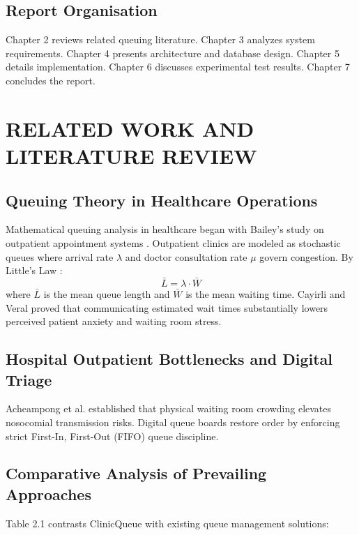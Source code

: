 \documentclass[12pt,a4paper,oneside]{report}
\begin{document}
\section{Report Organisation}
Chapter 2 reviews related queuing literature. Chapter 3 analyzes system requirements. Chapter 4 presents architecture and database design. Chapter 5 details implementation. Chapter 6 discusses experimental test results. Chapter 7 concludes the report.

\chapter{RELATED WORK AND LITERATURE REVIEW}

\section{Queuing Theory in Healthcare Operations}
Mathematical queuing analysis in healthcare began with Bailey's study on outpatient appointment systems \cite{bailey1952study}. Outpatient clinics are modeled as stochastic queues where arrival rate $\lambda$ and doctor consultation rate $\mu$ govern congestion. By Little's Law \cite{little1961proof}:
\begin{equation}
    \bar{L} = \lambda \cdot \bar{W}
\end{equation}
where $\bar{L}$ is the mean queue length and $\bar{W}$ is the mean waiting time. Cayirli and Veral \cite{cayirli2003outpatient} proved that communicating estimated wait times substantially lowers perceived patient anxiety and waiting room stress.

\section{Hospital Outpatient Bottlenecks and Digital Triage}
Acheampong et al. \cite{acheampong2019queuing} established that physical waiting room crowding elevates nosocomial transmission risks. Digital queue boards restore order by enforcing strict First-In, First-Out (FIFO) queue discipline.

\section{Comparative Analysis of Prevailing Approaches}
Table 2.1 contrasts ClinicQueue with existing queue management solutions:
\end{document}
